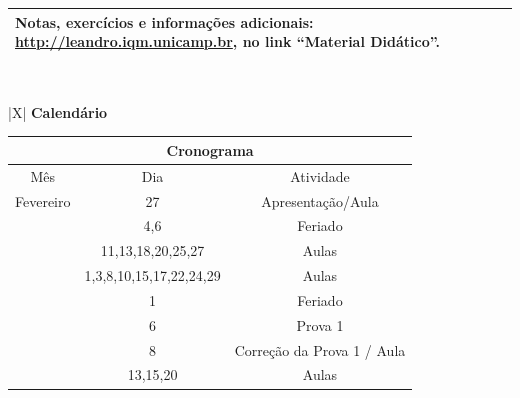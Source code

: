 \documentclass[11pt,a4paper,ssfamily]{exam}                                        %
\begin{document}
\begin{center}
\begin{tabularx}{\textwidth}{|X|}
\begin{minipage}[t]{0.95\columnwidth}
{Notas, exercícios e informações adicionais: 
\href{http://leandro.iqm.unicamp.br}{http://leandro.iqm.unicamp.br}, 
no link ``Material Didático''.
}\end{minipage}\vspace{0.1cm}\\                                                    %
\hline                                                                             %
\end{tabularx}\\                                                                   %
\vspace{0.5cm}                                                                     %
\begin{tabularx}{\textwidth}{|X|}                                                  %
\hline                                                                             %
\textbf{Calendário} \\                                        %
\hline                                                                             %
\begin{minipage}[t]{0.95\columnwidth}\vspace{0.1cm}\small{                         %
\begin{center}\begin{tabular}{ccc}
\hline
\multicolumn{3}{c}{{\bf Cronograma}} \\
\hline
Mês   &   Dia                &      Atividade          \\
\hline
Fevereiro  &
   27      &  Apresentação/Aula      \\
\hline
\multirow{2}{15mm}{\rotatebox{0}{\mbox{Março}}}  &
   4,6     &  Feriado                \\
 & 11,13,18,20,25,27  &  Aulas       \\
\hline
\multirow{1}{15mm}{\rotatebox{0}{\mbox{Abril}}}  &
   1,3,8,10,15,17,22,24,29  &  Aulas                  \\
\hline
\multirow{6}{15mm}{\rotatebox{0}{\mbox{Maio}}}  &
   1       &  Feriado  \\
 & 6       &  Prova 1 \\
 & 8       &  Correção da Prova 1 / Aula \\
 & 13,15,20 & Aulas \\

\end{tabular}
\end{center}}
\end{minipage}
\end{tabularx}
\end{center}
\end{document}
